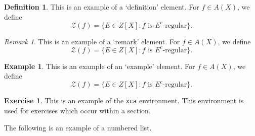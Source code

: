\documentclass{amsart}
\theoremstyle{definition}
\newtheorem{definition}[theorem]{Definition}
\newtheorem{example}[theorem]{Example}
\newtheorem{xca}[theorem]{Exercise}
\theoremstyle{remark}
\newtheorem{remark}[theorem]{Remark}
\numberwithin{equation}{section}
\begin{document}
\begin{definition}
This is an example of a `definition' element.
For $f\in A(X)$, we define
\begin{equation}
\mathcal{Z} (f)=\{E\in Z[X]: \text{$f$ is $E^c$-regular}\}.
\end{equation}
\end{definition}

\begin{remark}
This is an example of a `remark' element.
For $f\in A(X)$, we define
\begin{equation}
\mathcal{Z} (f)=\{E\in Z[X]: \text{$f$ is $E^c$-regular}\}.
\end{equation}
\end{remark}

\begin{example}
This is an example of an `example' element.
For $f\in A(X)$, we define
\begin{equation}
\mathcal{Z} (f)=\{E\in Z[X]: \text{$f$ is $E^c$-regular}\}.
\end{equation}
\end{example}

\begin{xca}
This is an example of the \texttt{xca} environment. This environment is
used for exercises which occur within a section.
\end{xca}

The following is an example of a numbered list.
\end{document}
